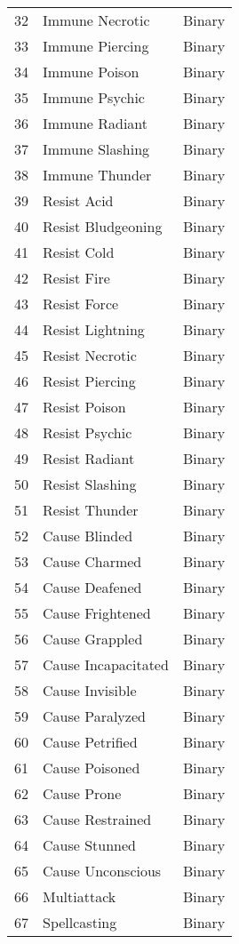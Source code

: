 \documentclass[12pt]{diazessay}
\begin{document}
\begin{table}[ht]
\begin{tiny}
\begin{minipage}[b]{0.45\linewidth}
\begin{tabular}{@{}rll@{}}
	32 & Immune Necrotic & Binary \\
	33 & Immune Piercing & Binary \\
	34 & Immune Poison & Binary \\
	35 & Immune Psychic & Binary \\
	36 & Immune Radiant & Binary \\
	37 & Immune Slashing & Binary \\
	38 & Immune Thunder & Binary \\
	39 & Resist Acid & Binary \\
	40 & Resist Bludgeoning & Binary \\
	41 & Resist Cold & Binary \\
	42 & Resist Fire & Binary \\
	43 & Resist Force & Binary \\
	44 & Resist Lightning & Binary \\
	45 & Resist Necrotic & Binary \\
	46 & Resist Piercing & Binary \\
	47 & Resist Poison & Binary \\
	48 & Resist Psychic & Binary \\
	49 & Resist Radiant & Binary \\
	50 & Resist Slashing & Binary \\
	51 & Resist Thunder & Binary \\
	52 & Cause Blinded & Binary \\
	53 & Cause Charmed & Binary \\
	54 & Cause Deafened & Binary \\
	55 & Cause Frightened & Binary \\
	56 & Cause Grappled & Binary \\
	57 & Cause Incapacitated & Binary \\
	58 & Cause Invisible & Binary \\
	59 & Cause Paralyzed & Binary \\
	60 & Cause Petrified & Binary \\
	61 & Cause Poisoned & Binary \\
	62 & Cause Prone & Binary \\
	63 & Cause Restrained & Binary \\
	64 & Cause Stunned & Binary \\
	65 & Cause Unconscious & Binary \\
	66 & Multiattack & Binary \\
	67 & Spellcasting & Binary \\

\end{tabular}
\end{minipage}
\end{tiny}
\end{table}
\end{document}

